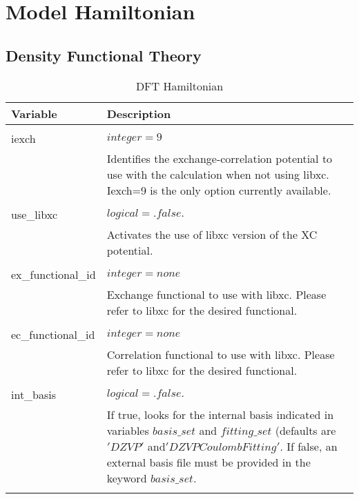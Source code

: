 \chapter{Model Hamiltonian}


\section{Density Functional Theory}
\begin{Spacing}{1.0}
   \begin{longtable}{ p{} p{} }
   
      \toprule
      \textbf{Variable} & Description \\*
      \midrule \\*
      \endhead
   
      \bottomrule
      \caption{DFT Hamiltonian}
      \endfoot
   
      iexch & $ integer = 9 $ \\
      & Identifies the exchange-correlation potential to use with the
      calculation when not using libxc. Iexch=9 is the only option
      currently available.\\
      \\
   
      use\_libxc & $ logical = .false. $ \\
      & Activates the use of libxc version of the XC potential.\\
      \\
   
      ex\_functional\_id & $ integer = none $ \\
      & Exchange functional to use with libxc. Please refer to libxc 
      for the desired functional.\\
      \\
   
      ec\_functional\_id & $ integer = none $ \\
      & Correlation functional to use with libxc. Please refer to libxc 
      for the desired functional.\\
      \\
   
      int\_basis & $ logical = .false. $ \\
      & If true, looks for the internal basis indicated in variables $basis\_set$
      and $fitting\_set$ (defaults are $'DZVP'$ and$'DZVP Coulomb Fitting'$. If
      false, an external basis file must be provided in the keyword $basis\_set$.\\
      \\
   

\end{longtable}
\end{Spacing}
